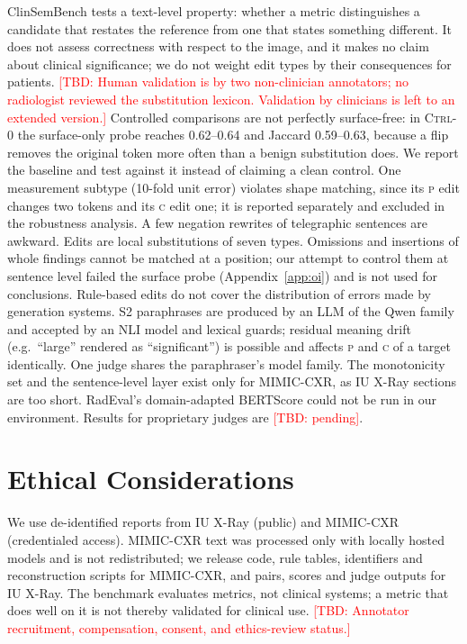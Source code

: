 \documentclass[11pt]{article}
\newcommand{\bench}{ClinSemBench\xspace}
\newcommand{\Pc}{\textsc{p}\xspace}
\newcommand{\Cc}{\textsc{c}\xspace}
\newcommand{\ctrlz}{\textsc{Ctrl-0}\xspace}
\newcommand{\tbd}[1]{\textcolor{red}{[TBD: #1]}}
\begin{document}
\bench tests a text-level property: whether a metric distinguishes a candidate that restates the reference from one that states something different. It does not assess correctness with respect to the image, and it makes no claim about clinical significance; we do not weight edit types by their consequences for patients. \tbd{Human validation is by two non-clinician annotators; no radiologist reviewed the substitution lexicon. Validation by clinicians is left to an extended version.}
Controlled comparisons are not perfectly surface-free: in \ctrlz the surface-only probe reaches 0.62--0.64 and Jaccard 0.59--0.63, because a flip removes the original token more often than a benign substitution does. We report the baseline and test against it instead of claiming a clean control. One measurement subtype (10-fold unit error) violates shape matching, since its \Pc edit changes two tokens and its \Cc edit one; it is reported separately and excluded in the robustness analysis. A few negation rewrites of telegraphic sentences are awkward.
Edits are local substitutions of seven types. Omissions and insertions of whole findings cannot be matched at a position; our attempt to control them at sentence level failed the surface probe (Appendix~\ref{app:oi}) and is not used for conclusions. Rule-based edits do not cover the distribution of errors made by generation systems.
S2 paraphrases are produced by an LLM of the Qwen family and accepted by an NLI model and lexical guards; residual meaning drift (e.g.\ ``large'' rendered as ``significant'') is possible and affects \Pc and \Cc of a target identically. One judge shares the paraphraser's model family.
The monotonicity set and the sentence-level layer exist only for MIMIC-CXR, as IU X-Ray sections are too short. RadEval's domain-adapted BERTScore could not be run in our environment. Results for proprietary judges are \tbd{pending}.

\section*{Ethical Considerations}

We use de-identified reports from IU X-Ray (public) and MIMIC-CXR (credentialed access). MIMIC-CXR text was processed only with locally hosted models and is not redistributed; we release code, rule tables, identifiers and reconstruction scripts for MIMIC-CXR, and pairs, scores and judge outputs for IU X-Ray. The benchmark evaluates metrics, not clinical systems; a metric that does well on it is not thereby validated for clinical use. \tbd{Annotator recruitment, compensation, consent, and ethics-review status.}
\end{document}

